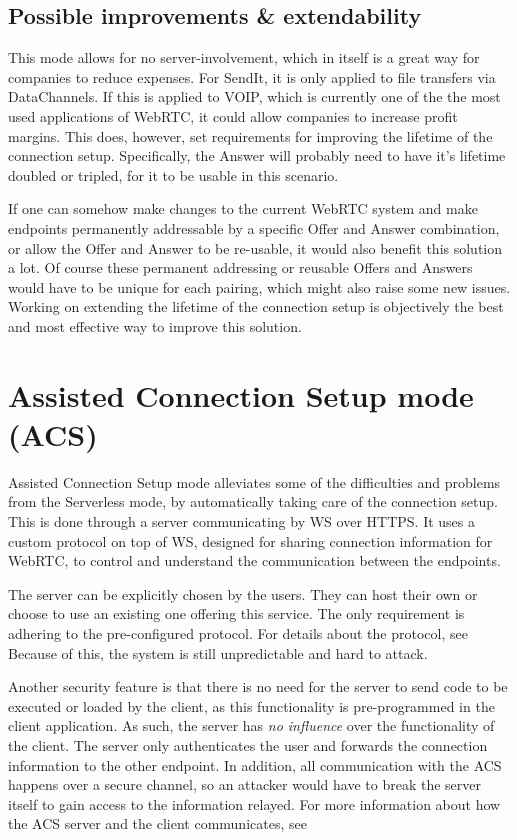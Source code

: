 \subsection{Possible improvements \& extendability}
%
This mode allows for no server-involvement, which in itself is a great way for companies to reduce expenses. For SendIt, it is only applied to file transfers via DataChannels. If this is applied to VOIP, which is currently one of the the most used applications of WebRTC, it could allow companies to increase profit margins. This does, however, set requirements for improving the lifetime of the connection setup. Specifically, the Answer will probably need to have it's lifetime doubled or tripled, for it to be usable in this scenario.

If one can somehow make changes to the current WebRTC system and make endpoints permanently addressable by a specific Offer and Answer combination, or allow the Offer and Answer to be re-usable, it would also benefit this solution a lot. Of course these permanent addressing or reusable Offers and Answers would have to be unique for each pairing, which might also raise some new issues. Working on extending the lifetime of the connection setup is objectively the best and most effective way to improve this solution.
%
%
\section{Assisted Connection Setup mode \textbf(ACS)}
%
%
Assisted Connection Setup mode alleviates some of the difficulties and problems from the Serverless mode, by automatically taking care of the connection setup. This is done through a server communicating by WS over HTTPS. It uses a custom protocol on top of WS, designed for sharing connection information for WebRTC, to control and understand the communication between the endpoints.

The server can be explicitly chosen by the users. They can host their own or choose to use an existing one offering this service. The only requirement is adhering to the pre-configured protocol. For details about the protocol, see  Because of this, the system is still unpredictable and hard to attack.

Another security feature is that there is no need for the server to send code to be executed or loaded by the client, as this functionality is pre-programmed in the client application. As such, the server has \emph{no influence} over the functionality of the client. The server only authenticates the user and forwards the connection information to the other endpoint.
In addition, all communication with the ACS happens over a secure channel, so an attacker would have to break the server itself to gain access to the information relayed. For more information about how the ACS server and the client communicates, see 
%

